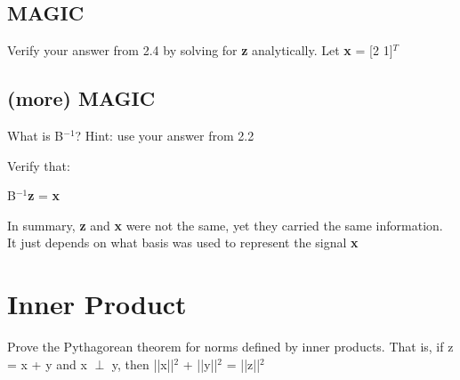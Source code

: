 \documentclass[11pt]{article}
\begin{document}
\subsection{MAGIC}
Verify your answer from 2.4 by solving for \textbf{z} analytically. Let \textbf{x} = [2 1]$^T$

\vspace{5mm}
\subsection{(more) MAGIC}
What is B$^{-1}$? Hint: use your answer from 2.2

\vspace{4mm}
Verify that:

\begin{center}

B$^{-1}$\textbf{z} = \textbf{x}

\end{center}

\vspace{10mm}
In summary, \textbf{z} and \textbf{x} were not the same, yet they carried the same information. It just depends on what basis was used to represent the signal \textbf{x}


\vspace{5mm}
\section{Inner Product}
Prove the Pythagorean theorem for norms defined by inner products. That is, if z = x + y and \newline
x $\perp$ y, then ||x||$^2$ + ||y||$^2$ = ||z||$^2$
\end{document}
